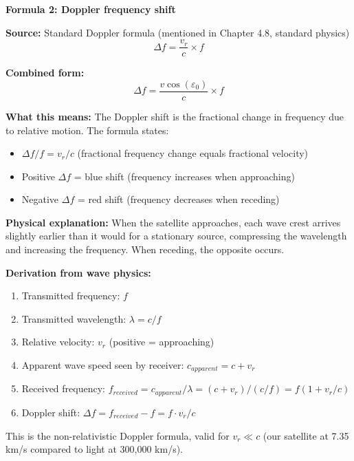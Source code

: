 \documentclass[11pt,letterpaper]{article}
\begin{document}
\vspace{0.3cm}

\textbf{Formula 2: Doppler frequency shift}

\textbf{Source:} Standard Doppler formula (mentioned in Chapter 4.8, standard physics)
\begin{equation}
\Delta f = \frac{v_r}{c} \times f
\end{equation}

\textbf{Combined form:}
\begin{equation}
\Delta f = \frac{v \cos(\varepsilon_0)}{c} \times f
\end{equation}

\textbf{What this means:} The Doppler shift is the fractional change in frequency due to relative motion. The formula states:
\begin{itemize}
    \item $\Delta f / f = v_r / c$ (fractional frequency change equals fractional velocity)
    \item Positive $\Delta f$ = blue shift (frequency increases when approaching)
    \item Negative $\Delta f$ = red shift (frequency decreases when receding)
\end{itemize}

\textbf{Physical explanation:} When the satellite approaches, each wave crest arrives slightly earlier than it would for a stationary source, compressing the wavelength and increasing the frequency. When receding, the opposite occurs.

\textbf{Derivation from wave physics:}
\begin{enumerate}
    \item Transmitted frequency: $f$
    \item Transmitted wavelength: $\lambda = c / f$
    \item Relative velocity: $v_r$ (positive = approaching)
    \item Apparent wave speed seen by receiver: $c_{apparent} = c + v_r$
    \item Received frequency: $f_{received} = c_{apparent} / \lambda = (c + v_r) / (c/f) = f(1 + v_r/c)$
    \item Doppler shift: $\Delta f = f_{received} - f = f \cdot v_r / c$
\end{enumerate}

This is the non-relativistic Doppler formula, valid for $v_r \ll c$ (our satellite at 7.35 km/s compared to light at 300,000 km/s).
\end{document}

